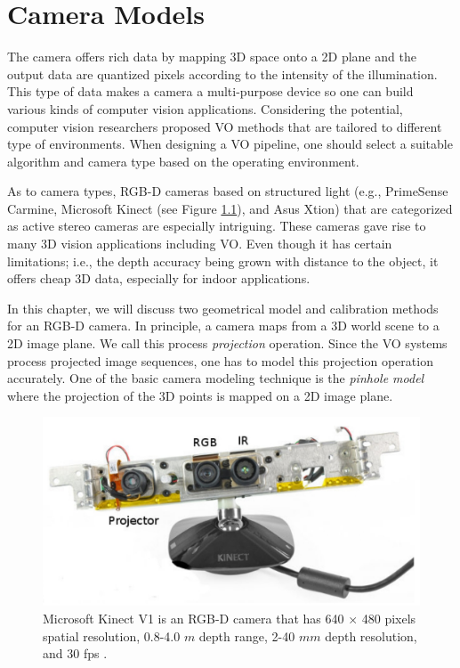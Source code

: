 \documentclass[12pt]{report}
\numberwithin{figure}{section}
\begin{document}


\chapter{Camera Models} \label{cp_cam_models}

The camera offers rich data by mapping 3D
space onto a 2D plane and the output data are quantized pixels according to the
intensity of the illumination.  This type of data makes a camera a
multi-purpose device so one can build various kinds of computer vision
applications.  Considering the potential, computer vision researchers proposed
VO methods that are tailored to different type of environments.  When
designing a VO pipeline, one should select a suitable algorithm and camera type
based on the operating environment.

As to camera types, RGB-D cameras based on structured light (e.g., PrimeSense
Carmine, Microsoft Kinect (see Figure \ref{fig:kinect_pic}), and Asus Xtion) 
that are categorized as active
stereo cameras are especially intriguing.  These cameras gave rise to many 3D
vision applications including VO. Even though it has certain limitations; i.e.,
the depth accuracy being grown with distance to the object, it offers cheap 3D 
data, especially for
indoor applications. 


In this chapter, we will discuss two geometrical model and calibration methods
for an RGB-D camera.  In principle, a camera maps from a 3D world scene to a 2D
image plane. We call this process \textit{projection} operation. Since the VO
systems process projected image sequences, one has to model this projection
operation accurately. One of the basic camera modeling technique is the
\textit{pinhole model} where the projection of the 3D points is mapped on a 2D
image plane.  

\begin{figure}[H]
	\centering
	\includegraphics[width=0.65\linewidth,natwidth=640,natheight=640]
	{fig/ref_imgs/kinect_pic.png}
  \caption[Microsoft Kinect V1]{Microsoft Kinect V1 is an RGB-D camera that 
  has 
  640 $\times$ 480 pixels spatial resolution, 0.8-4.0 $m$ depth range, 2-40 
  $mm$ depth resolution, and 30 fps \parencite{Smisek2011}.}
	\label{fig:kinect_pic}
\end{figure}
\end{document}
